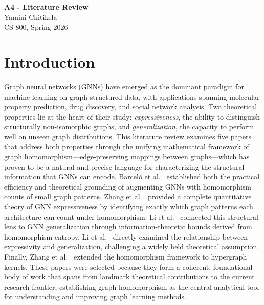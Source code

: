\documentclass[12pt]{article}
\begin{document}
\begin{centering}
{\large\textbf{A4 - Literature Review}}\\
\vspace{3mm}
Yamini Chitikela\\
CS 800, Spring 2026\\
\end{centering}


\section{Introduction}

Graph neural networks (GNNs) have emerged as the dominant paradigm for machine
learning on graph-structured data, with applications spanning molecular property
prediction, drug discovery, and social network analysis. Two theoretical
properties lie at the heart of their study: \textit{expressiveness}, the ability
to distinguish structurally non-isomorphic graphs, and \textit{generalization},
the capacity to perform well on unseen graph distributions. This literature review
examines five papers that address both properties through the unifying
mathematical framework of graph homomorphism---edge-preserving mappings between
graphs---which has proven to be a natural and precise language for characterizing
the structural information that GNNs can encode. Barcel\'{o} et al.~\cite{barcelo2021graph}
established both the practical efficiency and theoretical grounding of augmenting
GNNs with homomorphism counts of small graph patterns. Zhang et al.~\cite{zhang2024beyond}
provided a complete quantitative theory of GNN expressiveness by identifying
exactly which graph patterns each architecture can count under homomorphism.
Li et al.~\cite{li2024generalization} connected this structural lens to GNN generalization
through information-theoretic bounds derived from homomorphism entropy.
Li et al.~\cite{li2025towards} directly examined the relationship between expressivity and
generalization, challenging a widely held theoretical assumption. Finally,
Zhang et al.~\cite{zhang2026reinterpreting} extended the homomorphism framework to hypergraph
kernels. These papers were selected because they form a coherent, foundational
body of work that spans from landmark theoretical contributions to the current
research frontier, establishing graph homomorphism as the central analytical tool
for understanding and improving graph learning methods.
\end{document}
